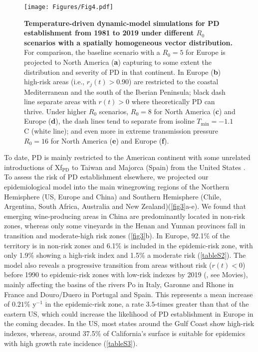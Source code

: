     \begin{figure}[b!]
        \centering
        \texttt{[image: Figures/Fig4.pdf]}
        \caption[Temperature-driven model simulations for PD
            establishment from 1981 to 2019]{\textbf{Temperature-driven
                dynamic-model simulations
                for PD
                establishment from 1981 to 2019 under different $R_0$ scenarios
                with a
                spatially homogeneous vector distribution.} For comparison, the
            baseline
            scenario with a $R_0=5$ for Europe is projected to North America
            (\textbf{a})
            capturing to some extent the distribution and severity of PD in
            that continent.
            In Europe (\textbf{b}) high-risk areas (i.e., $r_j(t) > 0.90$) are
            restricted
            to the coastal Mediterranean and the south of the Iberian
            Peninsula; black dash
            line separate areas with $r(t)>0$ where theoretically PD can
            thrive. Under
            higher $R_0$ scenarios, $R_0=8$ for North America (\textbf{c}) and
            Europe
            (\textbf{d}), the dash lines tend to separate from isoline
            $T_{\textrm{min}} =
                -1.1$\textdegree C (white line); and even more in extreme
            transmission pressure
            $R_0=16$ for North America (\textbf{e}) and Europe (\textbf{f}). }
        \label{fig4}
    \end{figure}

    To date, PD is mainly restricted to the American continent with some
    unrelated introductions of Xf$_{\textrm{PD}}$ to Taiwan and Majorca (Spain)
    from the United States \cite{Moralejo2019,Su2013}. To assess the risk of PD
    establishment elsewhere, we projected our epidemiological model into the
    main winegrowing regions of the Northern Hemisphere (US, Europe and China)
    and Southern Hemisphere (Chile, Argentina, South Africa, Australia and New
    Zealand)(\cref{fig3}a-e). We found that emerging wine-producing areas in
    China are predominantly located in non-risk zones, whereas only some
    vineyards in the Henan and Yunnan provinces fall in transition and
    moderate-high risk zones (\cref{fig3}b). In Europe, 92.1\% of the territory
    is in non-risk zones and 6.1\% is included in the epidemic-risk zone, with
    only 1.9\% showing a high-risk index and 1.5\% a moderate risk
    (\cref{tableS2}). The model also reveals a progressive transition from
    areas without risk ($r(t) < 0$) before 1990 to
    epidemic-risk zones with low-risk indexes by 2019 (\cite{Webpage}, see
    Movies), mainly affecting the basins of the rivers Po in Italy, Garonne and
    Rhone in France and Douro/Duero in Portugal and Spain. This represents a
    mean increase of $0.21\%$ y$^{-1}$ in the epidemic-risk zone, a rate
$3.5$-times greater than that of the eastern US, which could increase the
    likelihood of PD establishment in Europe in the coming decades. In the US,
    most states around the Gulf Coast show high-risk indexes, whereas, around
    37.5\% of California's surface is suitable for epidemics with high growth
    rate incidence (\cref{tableS3}).

